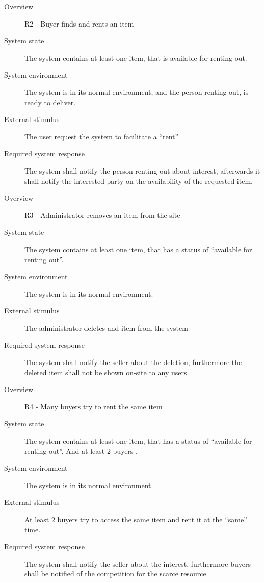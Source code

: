 \documentclass[a4paper,11pt]{report}
\newcommand{\seller}{ seller }
\newcommand{\buyers}{ buyers }
\newcommand{\Buyer}{ Buyer }
\begin{document}
\begin{description}
    \item[Overview] R2 - \Buyer finds and rents an item
    \item[System state] The system contains at least one item, that is
        available for renting out.
    \item[System environment] The system is in its normal environment, and the
        person renting out, is ready to deliver.
    \item[External stimulus] The user request the system to facilitate a
        ``rent''
    \item[Required system response] The system shall notify the person renting
        out about interest, afterwards it shall notify the interested party on
        the availability of the requested item.
\end{description}

\begin{description}
    \item[Overview] R3 - Administrator removes an item from the site
    \item[System state] The system contains at least one item, that has a
        status of ``available for renting out''.
    \item[System environment] The system is in its normal environment.
    \item[External stimulus] The administrator deletes and item from the system 
    \item[Required system response] The system shall notify the \seller about
        the deletion, furthermore the deleted item shall not be shown on-site
        to any users.
\end{description}

\begin{description}
    \item[Overview] R4 - Many \buyers try to rent the same item
    \item[System state] The system contains at least one item, that has a
        status of ``available for renting out''. And at least 2 \buyers.
    \item[System environment] The system is in its normal environment.
    \item[External stimulus] At least 2 \buyers try to access the same item and
        rent it at the ``same'' time.
    \item[Required system response] The system shall notify the \seller about
        the interest, furthermore \buyers shall be notified of the competition
        for the scarce resource.
\end{description}
\end{document}
